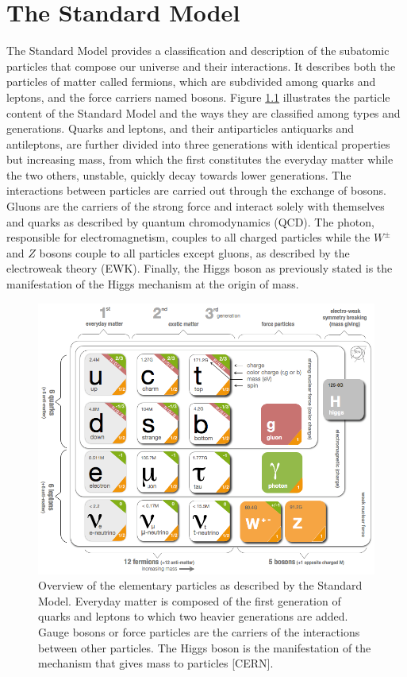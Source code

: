 
\chapter{The Standard Model}
\label{chap:I-1-standard-model}

  The Standard Model provides a classification and description of the subatomic particles that compose our universe and their interactions. It describes both the particles of matter called fermions, which are subdivided among quarks and leptons, and the force carriers named bosons. Figure \ref{fig:I-1-sm-particles} illustrates the particle content of the Standard Model and the ways they are classified among types and generations. Quarks and leptons, and their antiparticles antiquarks and antileptons, are further divided into three generations with identical properties but increasing mass, from which the first constitutes the everyday matter while the two others, unstable, quickly decay towards lower generations. The interactions between particles are carried out through the exchange of bosons. Gluons are the carriers of the strong force and interact solely with themselves and quarks as described by quantum chromodynamics (QCD). The photon, responsible for electromagnetism, couples to all charged particles while the $ W^\pm $ and $ Z $ bosons couple to all particles except gluons, as described by the electroweak theory (EWK). Finally, the Higgs boson as previously stated is the manifestation of the Higgs mechanism at the origin of mass. \\

	\begin{figure}[h!]
		\centering
		\includegraphics[width=\textwidth]{img/I-1-standard-model/sm-particles.png}
		\caption{Overview of the elementary particles as described by the Standard Model. Everyday matter is composed of the first generation of quarks and leptons to which two heavier generations are added. Gauge bosons or force particles are the carriers of the interactions between other particles. The Higgs boson is the manifestation of the mechanism that gives mass to particles [CERN].}
		\label{fig:I-1-sm-particles}
	\end{figure}

